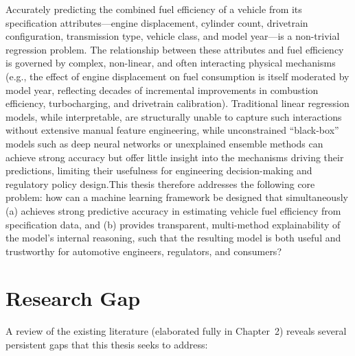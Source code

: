 Accurately predicting the combined fuel efficiency of a vehicle from its specification attributes---engine displacement, cylinder count, drivetrain configuration, transmission type, vehicle class, and model year---is a non-trivial regression problem. The relationship between these attributes and fuel efficiency is governed by complex, non-linear, and often interacting physical mechanisms (e.g., the effect of engine displacement on fuel consumption is itself moderated by model year, reflecting decades of incremental improvements in combustion efficiency, turbocharging, and drivetrain calibration). Traditional linear regression models, while interpretable, are structurally unable to capture such interactions without extensive manual feature engineering, while unconstrained ``black-box'' models such as deep neural networks or unexplained ensemble methods can achieve strong accuracy but offer little insight into the mechanisms driving their predictions, limiting their usefulness for engineering decision-making and regulatory policy design.This thesis therefore addresses the following core problem: how can a machine learning framework be designed that simultaneously (a) achieves strong predictive accuracy in estimating vehicle fuel efficiency from specification data, and (b) provides transparent, multi-method explainability of the model's internal reasoning, such that the resulting model is both useful and trustworthy for automotive engineers, regulators, and consumers?

\section{Research Gap}

A review of the existing literature (elaborated fully in Chapter~2) reveals several persistent gaps that this thesis seeks to address:

